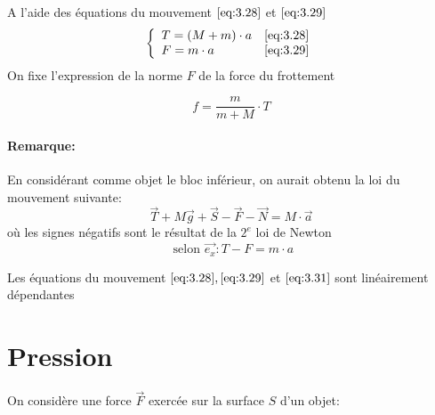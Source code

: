 \documentclass[
    11pt,
    a4paper,
    oneside,
    headinlcude, footinclude,
    twoside,
]{report}
\renewcommand{\vec}[1]{\overrightarrow{#1}}
\begin{document}
A l'aide des équations du mouvement $\eqref{eq:3.28}$ et $\eqref{eq:3.29}$
$$
\left\{
    \begin{array}{lc}
        T = (M+m) \cdot a & \eqref{eq:3.28}\\
        F = m \cdot a& \eqref{eq:3.29}\\
    \end{array}
\right.
$$
On fixe l'expression de la norme $F$ de la force du frottement 

\begin{equation}
    \label{eq:3.30}
    f=  \frac{m}{m+M} \cdot T
\end{equation}

\paragraph{Remarque:}

En considérant comme objet le bloc inférieur, on aurait obtenu la loi du
mouvement suivante:
$$\vec T + M \vec g + \vec S- \vec F - \vec N = M\cdot \vec a$$
où les signes négatifs sont le résultat de la $2^{e}$ loi de Newton 
\begin{equation}
    \label{eq:3.31}
    \text{ selon } \vec{e_{x}}: T - F = m \cdot a 
\end{equation}

Les équations du mouvement $\eqref{eq:3.28}, \eqref{eq:3.29}$ et $\eqref{eq:3.31}$
sont linéairement dépendantes


\section{Pression}
\label{sec:pression}

On considère une force $\vec F$ exercée sur la surface $S$ d'un objet:
\end{document}

